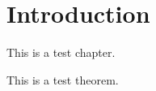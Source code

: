 
\chapter{Introduction}
This is a test chapter.

\begin{theorem}
\label{thm:test}
\leanok
This is a test theorem.
\end{theorem}